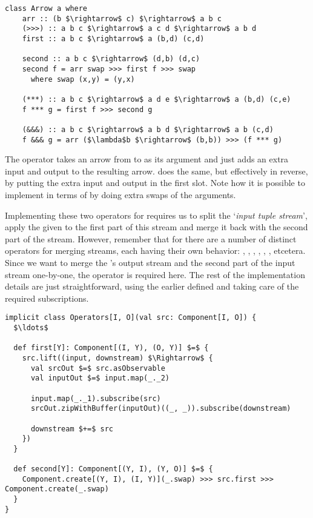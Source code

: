 \begin{lstlisting}[style=HaskellStyle, caption={\textit{Arrow} type class}, label={lst:arrow-typeclass-full}]
class Arrow a where
    arr :: (b $\rightarrow$ c) $\rightarrow$ a b c
    (>>>) :: a b c $\rightarrow$ a c d $\rightarrow$ a b d
    first :: a b c $\rightarrow$ a (b,d) (c,d)
    
    second :: a b c $\rightarrow$ (d,b) (d,c)
    second f = arr swap >>> first f >>> swap
      where swap (x,y) = (y,x)
      
    (***) :: a b c $\rightarrow$ a d e $\rightarrow$ a (b,d) (c,e)
    f *** g = first f >>> second g
    
    (&&&) :: a b c $\rightarrow$ a b d $\rightarrow$ a b (c,d)
    f &&& g = arr ($\lambda$b $\rightarrow$ (b,b)) >>> (f *** g)
\end{lstlisting}

The operator  takes an arrow from  to  as its argument and just adds an extra input and output to the resulting arrow.  does the same, but effectively in reverse, by putting the extra input and output in the first slot. Note how it is possible to implement  in terms of  by doing extra swaps of the arguments.


Implementing these two operators for \comp requires us to split the `\textit{input tuple stream}', apply the given \comp to the first part of this stream and merge it back with the second part of the stream. However, remember that for \obs there are a number of distinct operators for merging streams, each having their own behavior: , , , , , , etcetera. Since we want to merge the \comp's output stream and the second part of the input stream one-by-one, the  operator is required here. The rest of the implementation details are just straightforward, using the earlier defined  and taking care of the required subscriptions.

\begin{lstlisting}[style=ScalaStyle, caption={Implementations of the \textit{Arrow}'s \code{first} and \code{second} operators}, label={lst:first-and-second}]
implicit class Operators[I, O](val src: Component[I, O]) {
  $\ldots$

  def first[Y]: Component[(I, Y), (O, Y)] $=$ {
    src.lift((input, downstream) $\Rightarrow$ {
      val srcOut $=$ src.asObservable
      val inputOut $=$ input.map(_._2)

      input.map(_._1).subscribe(src)
      srcOut.zipWithBuffer(inputOut)((_, _)).subscribe(downstream)

      downstream $+=$ src
    })
  }

  def second[Y]: Component[(Y, I), (Y, O)] $=$ {
    Component.create[(Y, I), (I, Y)](_.swap) >>> src.first >>> Component.create(_.swap)
  }
}
\end{lstlisting}

